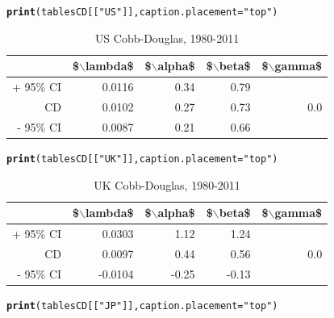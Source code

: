 \documentclass[preprint,authoryear,12pt]{elsarticle}\usepackage{graphicx, color}
\makeatletter
\newcommand{\hlfunctioncall}[1]{\textcolor[rgb]{0.501960784313725,0,0.329411764705882}{\textbf{#1}}}%
\newcommand{\hlstring}[1]{\textcolor[rgb]{0.6,0.6,1}{#1}}%
\newenvironment{kframe}{%
 \def\at@end@of@kframe{}%
 \ifinner\ifhmode%
  \def\at@end@of@kframe{\end{minipage}}%
  \begin{minipage}{\columnwidth}%
 \fi\fi%
 \def\FrameCommand##1{\hskip\@totalleftmargin \hskip-\fboxsep
 \colorbox{shadecolor}{##1}\hskip-\fboxsep
     \hskip-\linewidth \hskip-\@totalleftmargin \hskip\columnwidth}%
 \MakeFramed {\advance\hsize-\width
   \@totalleftmargin\z@ \linewidth\hsize
   \@setminipage}}%
 {\par\unskip\endMakeFramed%
 \at@end@of@kframe}
\makeatother
\begin{document}
\begin{kframe}
\begin{alltt}
\hlfunctioncall{print}(tablesCD[[\hlstring{"US"}]], caption.placement=\hlstring{"top"})
\end{alltt}
\end{kframe}%
\begin{table}[ht]
\begin{center}
\caption{US Cobb-Douglas, 1980-2011}
\begin{tabular}{rrrrr}
  \hline
 & \$$\backslash$lambda\$ & \$$\backslash$alpha\$ & \$$\backslash$beta\$ & \$$\backslash$gamma\$ \\ 
  \hline
+ 95\% CI & 0.0116 & 0.34 & 0.79 &  \\ 
  CD & 0.0102 & 0.27 & 0.73 & 0.0 \\ 
  - 95\% CI & 0.0087 & 0.21 & 0.66 &  \\ 
   \hline
\end{tabular}
\end{center}
\end{table}
\begin{kframe}\begin{alltt}
\hlfunctioncall{print}(tablesCD[[\hlstring{"UK"}]], caption.placement=\hlstring{"top"})
\end{alltt}
\end{kframe}%
\begin{table}[ht]
\begin{center}
\caption{UK Cobb-Douglas, 1980-2011}
\begin{tabular}{rrrrr}
  \hline
 & \$$\backslash$lambda\$ & \$$\backslash$alpha\$ & \$$\backslash$beta\$ & \$$\backslash$gamma\$ \\ 
  \hline
+ 95\% CI & 0.0303 & 1.12 & 1.24 &  \\ 
  CD & 0.0097 & 0.44 & 0.56 & 0.0 \\ 
  - 95\% CI & -0.0104 & -0.25 & -0.13 &  \\ 
   \hline
\end{tabular}
\end{center}
\end{table}
\begin{kframe}\begin{alltt}
\hlfunctioncall{print}(tablesCD[[\hlstring{"JP"}]], caption.placement=\hlstring{"top"})
\end{alltt}
\end{kframe}%
\end{document}
